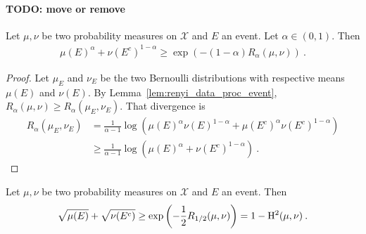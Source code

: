 


\paragraph{TODO: move or remove}


\begin{lemma}
  \label{lem:testing_bound_renyi_mean}
  Let $\mu, \nu$ be two probability measures on $\mathcal X$ and $E$ an event. Let $\alpha \in (0,1)$. Then
  \begin{align*}
  \mu(E)^\alpha + \nu(E^c)^{1 - \alpha}
  \ge \exp\left(-(1 - \alpha) R_{\alpha}(\mu, \nu)\right)
  \: .
  \end{align*}
\end{lemma}

\begin{proof}
Let $\mu_E$ and $\nu_E$ be the two Bernoulli distributions with respective means $\mu(E)$ and $\nu(E)$.
By Lemma~\ref{lem:renyi_data_proc_event}, $R_\alpha(\mu, \nu) \ge R_\alpha(\mu_E, \nu_E)$. That divergence is
\begin{align*}
R_\alpha(\mu_E, \nu_E)
&= \frac{1}{\alpha - 1}\log \left(\mu(E)^\alpha \nu(E)^{1 - \alpha}
  + \mu(E^c)^\alpha \nu(E^c)^{1 - \alpha}\right)
\\
&\ge \frac{1}{\alpha - 1}\log \left(\mu(E)^\alpha + \nu(E^c)^{1 - \alpha}\right)
\: .
\end{align*}
\end{proof}

\begin{corollary}
  \label{cor:testing_bound_hellinger}
  Let $\mu, \nu$ be two probability measures on $\mathcal X$ and $E$ an event. Then
  \begin{align*}
  \sqrt{\mu(E)} + \sqrt{\nu(E^c)}
  \ge \exp\left(-\frac{1}{2} R_{1/2}(\mu, \nu)\right)
  = 1 - \operatorname{H^2}(\mu, \nu)
  \: .
  \end{align*}
\end{corollary}

